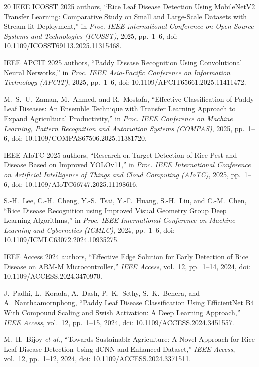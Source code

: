 \documentclass[conference]{IEEEtran}
\begin{document}
\begin{thebibliography}{20}
 IEEE ICOSST 2025 authors, ``Rice Leaf Disease Detection Using MobileNetV2 Transfer Learning: Comparative Study on Small and Large-Scale Datasets with Stream-lit Deployment,'' in \textit{Proc. IEEE International Conference on Open Source Systems and Technologies (ICOSST)}, 2025, pp.~1--6, doi: 10.1109/ICOSST69113.2025.11315468.

 IEEE APCIT 2025 authors, ``Paddy Disease Recognition Using Convolutional Neural Networks,'' in \textit{Proc. IEEE Asia-Pacific Conference on Information Technology (APCIT)}, 2025, pp.~1--6, doi: 10.1109/APCIT65661.2025.11411472.

 M.~S.~U.~Zaman, M.~Ahmed, and R.~Mostafa, ``Effective Classification of Paddy Leaf Diseases: An Ensemble Technique with Transfer Learning Approach to Expand Agricultural Productivity,'' in \textit{Proc. IEEE Conference on Machine Learning, Pattern Recognition and Automation Systems (COMPAS)}, 2025, pp.~1--6, doi: 10.1109/COMPAS67506.2025.11381720.

 IEEE AIoTC 2025 authors, ``Research on Target Detection of Rice Pest and Disease Based on Improved YOLOv11,'' in \textit{Proc. IEEE International Conference on Artificial Intelligence of Things and Cloud Computing (AIoTC)}, 2025, pp.~1--6, doi: 10.1109/AIoTC66747.2025.11198616.

 S.-H.~Lee, C.-H.~Cheng, Y.-S.~Tsai, Y.-F.~Huang, S.-H.~Liu, and C.-M.~Chen, ``Rice Disease Recognition using Improved Visual Geometry Group Deep Learning Algorithms,'' in \textit{Proc. IEEE International Conference on Machine Learning and Cybernetics (ICMLC)}, 2024, pp.~1--6, doi: 10.1109/ICMLC63072.2024.10935275.

 IEEE Access 2024 authors, ``Effective Edge Solution for Early Detection of Rice Disease on ARM-M Microcontroller,'' \textit{IEEE Access}, vol.~12, pp.~1--14, 2024, doi: 10.1109/ACCESS.2024.3470970.

 J.~Padhi, L.~Korada, A.~Dash, P.~K.~Sethy, S.~K.~Behera, and A.~Nanthaamornphong, ``Paddy Leaf Disease Classification Using EfficientNet B4 With Compound Scaling and Swish Activation: A Deep Learning Approach,'' \textit{IEEE Access}, vol.~12, pp.~1--15, 2024, doi: 10.1109/ACCESS.2024.3451557.

 M.~H.~Bijoy \textit{et al.}, ``Towards Sustainable Agriculture: A Novel Approach for Rice Leaf Disease Detection Using dCNN and Enhanced Dataset,'' \textit{IEEE Access}, vol.~12, pp.~1--12, 2024, doi: 10.1109/ACCESS.2024.3371511.


\end{thebibliography}
\end{document}
